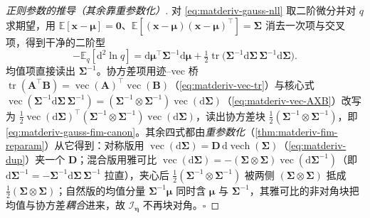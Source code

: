 \begin{proof}[正则参数的推导（其余靠重参数化）]
对 \cref{eq:matderiv-gauss-nll} 取二阶微分并对 $q$ 求期望，用 $\mathbb{E}[\mathbf{x}-\boldsymbol{\mu}]=\mathbf{0}$、$\mathbb{E}[(\mathbf{x}-\boldsymbol{\mu})(\mathbf{x}-\boldsymbol{\mu})^\top]=\boldsymbol{\Sigma}$ 消去一次项与交叉项，得到干净的二阶型
\begin{equation*}
  -\mathbb{E}_q[\mathrm{d}^2\ln q]
  =\mathrm{d}\boldsymbol{\mu}^\top\boldsymbol{\Sigma}^{-1}\mathrm{d}\boldsymbol{\mu}
  +\tfrac12\operatorname{tr}\!\big(\boldsymbol{\Sigma}^{-1}\mathrm{d}\boldsymbol{\Sigma}\,\boldsymbol{\Sigma}^{-1}\mathrm{d}\boldsymbol{\Sigma}\big).
\end{equation*}
均值项直接读出 $\boldsymbol{\Sigma}^{-1}$。协方差项用迹--vec 桥 $\operatorname{tr}(\mathbf{A}^\top\mathbf{B})=\operatorname{vec}(\mathbf{A})^\top\operatorname{vec}(\mathbf{B})$（\cref{eq:matderiv-vec-tr}）与核心式 $\operatorname{vec}(\boldsymbol{\Sigma}^{-1}\mathrm{d}\boldsymbol{\Sigma}\,\boldsymbol{\Sigma}^{-1})=(\boldsymbol{\Sigma}^{-1}\otimes\boldsymbol{\Sigma}^{-1})\operatorname{vec}(\mathrm{d}\boldsymbol{\Sigma})$（\cref{eq:matderiv-vec-AXB}）改写为 $\tfrac12\operatorname{vec}(\mathrm{d}\boldsymbol{\Sigma})^\top(\boldsymbol{\Sigma}^{-1}\otimes\boldsymbol{\Sigma}^{-1})\operatorname{vec}(\mathrm{d}\boldsymbol{\Sigma})$，读出协方差块 $\tfrac12(\boldsymbol{\Sigma}^{-1}\otimes\boldsymbol{\Sigma}^{-1})$，即 \cref{eq:matderiv-gauss-fim-canon}。其余四式都由\emph{重参数化}（\cref{thm:matderiv-fim-reparam}）从它得到：对称版用 $\operatorname{vec}(\mathrm{d}\boldsymbol{\Sigma})=\mathbf{D}\,\mathrm{d}\operatorname{vech}(\boldsymbol{\Sigma})$（\cref{eq:matderiv-dup}）夹一个 $\mathbf{D}$；混合版用雅可比 $\operatorname{vec}(\mathrm{d}\boldsymbol{\Sigma})=-(\boldsymbol{\Sigma}\otimes\boldsymbol{\Sigma})\operatorname{vec}(\mathrm{d}\boldsymbol{\Sigma}^{-1})$（即 $\mathrm{d}\boldsymbol{\Sigma}^{-1}=-\boldsymbol{\Sigma}^{-1}\mathrm{d}\boldsymbol{\Sigma}\,\boldsymbol{\Sigma}^{-1}$ 拉直），夹心后 $\tfrac12(\boldsymbol{\Sigma}^{-1}\otimes\boldsymbol{\Sigma}^{-1})$ 被两侧 $(\boldsymbol{\Sigma}\otimes\boldsymbol{\Sigma})$ 抵成 $\tfrac12(\boldsymbol{\Sigma}\otimes\boldsymbol{\Sigma})$；自然版的均值分量 $\boldsymbol{\Sigma}^{-1}\boldsymbol{\mu}$ 同时含 $\boldsymbol{\mu}$ 与 $\boldsymbol{\Sigma}^{-1}$，其雅可比的非对角块把均值与协方差\emph{耦合}进来，故 $\boldsymbol{\mathcal{I}}_{\boldsymbol{\eta}}$ 不再块对角。\hfill$\square$
\end{proof}

